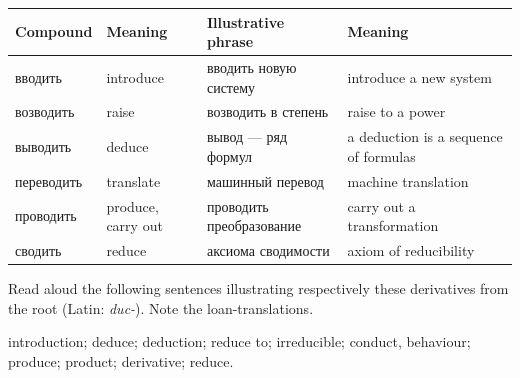 \begingroup
\small
\setlength{\tabcolsep}{3pt}
\renewcommand{\arraystretch}{1.08}
\begin{longtable}{@{}>{\cyrillicfont}p{27mm}p{27mm}>{\cyrillicfont}p{49mm}p{38mm}@{}}
\toprule
\normalfont Compound & Meaning & \normalfont Illustrative phrase & Meaning\\
\midrule
\endhead
вводить & introduce & вводить новую систему & introduce a new system\\
возводить & raise & возводить в степень & raise to a power\\
выводить & deduce & вывод --- ряд формул & a deduction is a sequence of formulas\\
переводить & translate & машинный перевод & machine translation\\
проводить & produce, carry out & проводить преобразование & carry out a transformation\\
сводить & reduce & аксиома сводимости & axiom of reducibility\\
\bottomrule
\end{longtable}
\endgroup

\begin{keybox}[Exercise 5.1]
Read aloud the following sentences illustrating respectively these derivatives from the root  (Latin: \emph{duc-}). Note the loan-translations.
\end{keybox}

\noindent{} introduction;  deduce;  deduction;  reduce to;  irreducible;  conduct, behaviour;  produce;  product;  derivative;  reduce.


